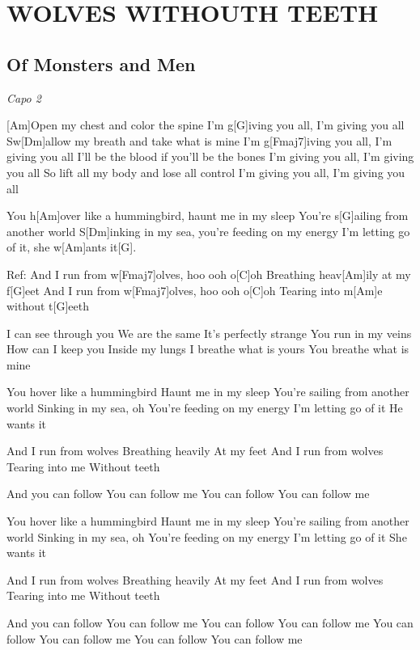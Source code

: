 \documentclass{article}
\begin{document}
\section*{WOLVES WITHOUTH TEETH}
%
\subsection*{Of Monsters and Men}
\begin{guitar}
	\textit{Capo 2}
	
	 
	[Am]Open my chest and color the spine
	I'm g[G]iving you all, I'm giving you all
	Sw[Dm]allow my breath and take what is mine
	I'm g[Fmaj7]iving you all, I'm giving you all
	I'll be the blood if you'll be the bones
	I'm giving you all, I'm giving you all
	So lift all my body and lose all control
	I'm giving you all, I'm giving you all
	
    You h[Am]over like a hummingbird, haunt me in my sleep
    You're s[G]ailing from another world
    S[Dm]inking in my sea, you're feeding on my energy
    I'm letting go of it, she w[Am]ants it[G].
    
    
    Ref:
    And I run from w[Fmaj7]olves, hoo ooh o[C]oh
    Breathing heav[Am]ily at my f[G]eet
    And I run from w[Fmaj7]olves, hoo ooh o[C]oh
    Tearing into m[Am]e without t[G]eeth
    
    
    
    I can see through you
    We are the same
    It's perfectly strange
    You run in my veins
    How can I keep you
    Inside my lungs
    I breathe what is yours
    You breathe what is mine
    
    You hover like a hummingbird
    Haunt me in my sleep
    You're sailing from another world
    Sinking in my sea, oh
    You're feeding on my energy
    I'm letting go of it
    He wants it
    
    And I run from wolves
    Breathing heavily
    At my feet
    And I run from wolves
    Tearing into me
    Without teeth
    
    And you can follow
    You can follow me
    You can follow
    You can follow me
    
    You hover like a hummingbird
    Haunt me in my sleep
    You're sailing from another world
    Sinking in my sea, oh
    You're feeding on my energy
    I'm letting go of it
    She wants it
    
    And I run from wolves
    Breathing heavily
    At my feet
    And I run from wolves
    Tearing into me
    Without teeth
    
    And you can follow
    You can follow me
    You can follow
    You can follow me
    You can follow
    You can follow me
    You can follow
    You can follow me 
	
\end{guitar}
\end{document}
